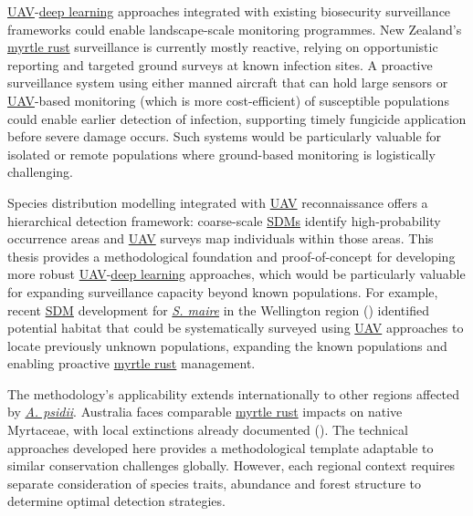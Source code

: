 \documentclass[
]{scrreprt}
\begin{document}
\hyperref[acronyms_UAV]{UAV}-\hyperref[acronyms_DL]{deep learning}
approaches integrated with existing biosecurity surveillance frameworks
could enable landscape-scale monitoring programmes. New Zealand's
\hyperref[acronyms_MR]{myrtle rust} surveillance is currently mostly
reactive, relying on opportunistic reporting and targeted ground surveys
at known infection sites. A proactive surveillance system using either
manned aircraft that can hold large sensors or
\hyperref[acronyms_UAV]{UAV}-based monitoring (which is more
cost-efficient) of susceptible populations could enable earlier
detection of infection, supporting timely fungicide application before
severe damage occurs. Such systems would be particularly valuable for
isolated or remote populations where ground-based monitoring is
logistically challenging.

Species distribution modelling integrated with
\hyperref[acronyms_UAV]{UAV} reconnaissance offers a hierarchical
detection framework: coarse-scale \hyperref[acronyms_SDM]{SDMs} identify
high-probability occurrence areas and \hyperref[acronyms_UAV]{UAV}
surveys map individuals within those areas. This thesis provides a
methodological foundation and proof-of-concept for developing more
robust \hyperref[acronyms_UAV]{UAV}-\hyperref[acronyms_DL]{deep
learning} approaches, which would be particularly valuable for expanding
surveillance capacity beyond known populations. For example, recent
\hyperref[acronyms_SDM]{SDM} development for
\hyperref[acronyms_SM]{\emph{S. maire}} in the Wellington region
()
identified potential habitat that could be systematically surveyed using
\hyperref[acronyms_UAV]{UAV} approaches to locate previously unknown
populations, expanding the known populations and enabling proactive
\hyperref[acronyms_MR]{myrtle rust} management.

The methodology's applicability extends internationally to other regions
affected by \hyperref[acronyms_AP]{\emph{A. psidii}}. Australia faces
comparable \hyperref[acronyms_MR]{myrtle rust} impacts on native
Myrtaceae, with local extinctions already documented
(). The technical approaches developed here provides
a methodological template adaptable to similar conservation challenges
globally. However, each regional context requires separate consideration
of species traits, abundance and forest structure to determine optimal
detection strategies.
\end{document}
